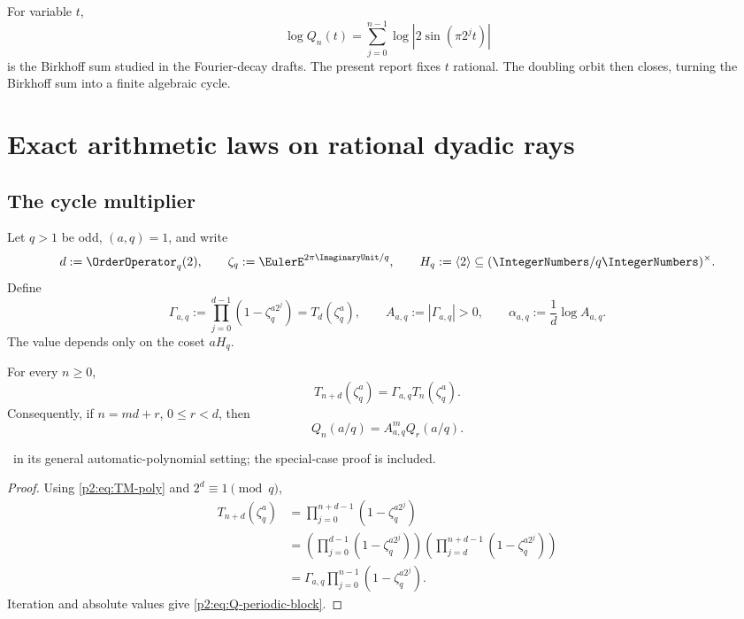 \documentclass[11pt,oneside]{article}
\theoremstyle{definition}
\theoremstyle{remark}
\begin{document}
\begin{remark}
For variable $t$,
\[
 \log Q_n(t)=\sum_{j=0}^{n-1}\log|2\sin(\pi2^jt)|
\]
is the Birkhoff sum studied in the Fourier-decay drafts. The present report fixes
$t$ rational. The doubling orbit then closes, turning the Birkhoff sum into a
finite algebraic cycle.
\end{remark}

\section{Exact arithmetic laws on rational dyadic rays}\label{p2:sec:rational-rays}

\subsection{The cycle multiplier}

Let $q>1$ be odd, $(a,q)=1$, and write
\begin{equation}
 d:=\OrderOperator_q(2),\qquad
 \zeta_q:=\EulerE^{2\pi\ImaginaryUnit/q},\qquad
 H_q:=\langle2\rangle\subseteq(\IntegerNumbers/q\IntegerNumbers)^\times.
 \label{p2:eq:q-d-H}
\end{equation}
Define
\begin{equation}
 \Gamma_{a,q}:=\prod_{j=0}^{d-1}(1-\zeta_q^{a2^j})=T_d(\zeta_q^a),
 \qquad A_{a,q}:=|\Gamma_{a,q}|>0,
 \qquad \alpha_{a,q}:=\frac1d\log A_{a,q}.
 \label{p2:eq:Gamma-A-alpha}
\end{equation}
The value depends only on the coset $aH_q$.

\begin{proposition}\label{p2:prop:root-recurrence}
For every $n\ge0$,
\begin{equation}
 T_{n+d}(\zeta_q^a)=\Gamma_{a,q}T_n(\zeta_q^a).
 \label{p2:eq:root-recurrence}
\end{equation}
Consequently, if $n=md+r$, $0\le r<d$, then
\begin{equation}
 Q_n(a/q)=A_{a,q}^mQ_r(a/q).
 \label{p2:eq:Q-periodic-block}
\end{equation}

\smallskip\noindent\importedPartx\ in its general automatic-polynomial setting; the
special-case proof is included.
\end{proposition}

\begin{proof}
Using \eqref{p2:eq:TM-poly} and $2^d\equiv1\pmod q$,
\begin{align*}
 T_{n+d}(\zeta_q^a)
 &=\prod_{j=0}^{n+d-1}(1-\zeta_q^{a2^j})\\
 &=\left(\prod_{j=0}^{d-1}(1-\zeta_q^{a2^j})\right)
   \left(\prod_{j=d}^{n+d-1}(1-\zeta_q^{a2^j})\right)\\
 &=\Gamma_{a,q}\prod_{j=0}^{n-1}(1-\zeta_q^{a2^j}).
\end{align*}
Iteration and absolute values give \eqref{p2:eq:Q-periodic-block}.
\end{proof}
\end{document}
